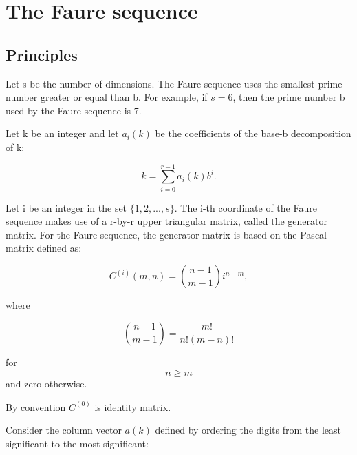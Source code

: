 %

\chapter{The Faure sequence}

\section{Principles}

    
      Let s be the number of dimensions.
      The Faure sequence uses the smallest prime number greater or equal than
      b.
      For example, if $s=6$, then the prime number b used by the Faure
      sequence is 7.
    

    
      Let k be an integer and let $a_i(k)$ be the coefficients of the
      base-b decomposition of k:
    

    
      $$
        k=\sum_{i=0}^{r-1} a_i(k) b^i.
      $$
    

    
      Let i be an integer in the set $\{1,2,...,s\}$.
      The i-th coordinate of the Faure sequence makes use of a r-by-r upper
      triangular matrix, called the generator matrix. 
	  For the Faure sequence, the generator matrix is based on the 
	  Pascal matrix defined as:
    

    
      $$
        C^{(i)}(m,n) = {n-1 \choose m-1} i^{n-m},
      $$
    

    
      where
    

    
      $$
        {n-1 \choose m-1} = \frac{m!}{n!(m-n)!}
      $$
    

    
      for $$n\geq m$$ and zero otherwise.
    

    
      By convention $C^{(0)}$ is identity matrix.
    

    
      Consider the column vector $a(k)$ defined by ordering the
      digits from the least significant to the most significant:
    

